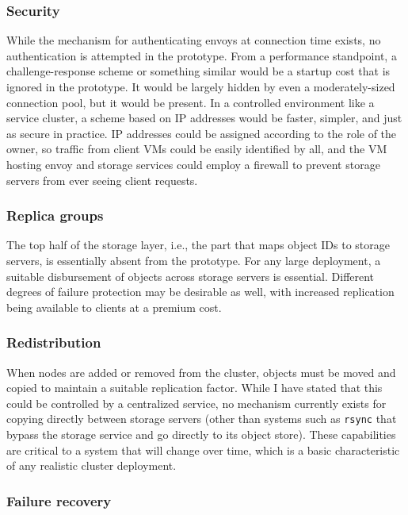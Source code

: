 \subsubsection{Security}

While the mechanism for authenticating envoys at connection time exists, no authentication is attempted in the prototype. From a performance standpoint, a challenge-response scheme or something similar would be a startup cost that is ignored in the prototype. It would be largely hidden by even a moderately-sized connection pool, but it would be present. In a controlled environment like a service cluster, a scheme based on IP addresses would be faster, simpler, and just as secure in practice. IP addresses could be assigned according to the role of the owner, so traffic from client VMs could be easily identified by all, and the VM hosting envoy and storage services could employ a firewall to prevent storage servers from ever seeing client requests.

\subsubsection{Replica groups}

The top half of the storage layer, i.e., the part that maps object IDs to storage servers, is essentially absent from the prototype. For any large deployment, a suitable disbursement of objects across storage servers is essential. Different degrees of failure protection may be desirable as well, with increased replication being available to clients at a premium cost.

\subsubsection{Redistribution}

When nodes are added or removed from the cluster, objects must be moved and copied to maintain a suitable replication factor. While I have stated that this could be controlled by a centralized service, no mechanism currently exists for copying directly between storage servers (other than systems such as \texttt{rsync} that bypass the storage service and go directly to its object store). These capabilities are critical to a system that will change over time, which is a basic characteristic of any realistic cluster deployment.

\subsubsection{Failure recovery}

